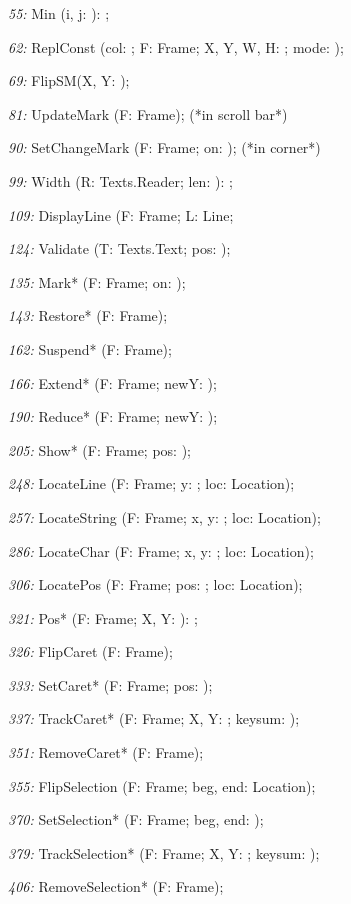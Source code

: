 \item{\it 55:} Min (i, j: \INTEGER): \INTEGER;
\item{\it 62:} ReplConst (col: \INTEGER; F: Frame; X, Y, W, H: \INTEGER; mode: \INTEGER);
\item{\it 69:} FlipSM(X, Y: \INTEGER);
\item{\it 81:} UpdateMark (F: Frame);  (*in scroll bar*)
\item{\it 90:} SetChangeMark (F: Frame; on: \BOOLEAN);  (*in corner*)
\item{\it 99:} Width (\VAR R: Texts.Reader; len: \LONGINT): \INTEGER;
\item{\it 109:} DisplayLine (F: Frame; L: Line;
\item{\it 124:} Validate (T: Texts.Text; \VAR pos: \LONGINT);
\item{\it 135:} Mark* (F: Frame; on: \BOOLEAN);
\item{\it 143:} Restore* (F: Frame);
\item{\it 162:} Suspend* (F: Frame);
\item{\it 166:} Extend* (F: Frame; newY: \INTEGER);
\item{\it 190:} Reduce* (F: Frame; newY: \INTEGER);
\item{\it 205:} Show* (F: Frame; pos: \LONGINT);
\item{\it 248:} LocateLine (F: Frame; y: \INTEGER; \VAR loc: Location);
\item{\it 257:} LocateString (F: Frame; x, y: \INTEGER; \VAR loc: Location);
\item{\it 286:} LocateChar (F: Frame; x, y: \INTEGER; \VAR loc: Location);
\item{\it 306:} LocatePos (F: Frame; pos: \LONGINT; \VAR loc: Location);
\item{\it 321:} Pos* (F: Frame; X, Y: \INTEGER): \LONGINT;
\item{\it 326:} FlipCaret (F: Frame);
\item{\it 333:} SetCaret* (F: Frame; pos: \LONGINT);
\item{\it 337:} TrackCaret* (F: Frame; X, Y: \INTEGER; \VAR keysum: \SET);
\item{\it 351:} RemoveCaret* (F: Frame);
\item{\it 355:} FlipSelection (F: Frame; \VAR beg, end: Location);
\item{\it 370:} SetSelection* (F: Frame; beg, end: \LONGINT);
\item{\it 379:} TrackSelection* (F: Frame; X, Y: \INTEGER; \VAR keysum: \SET);
\item{\it 406:} RemoveSelection* (F: Frame);
